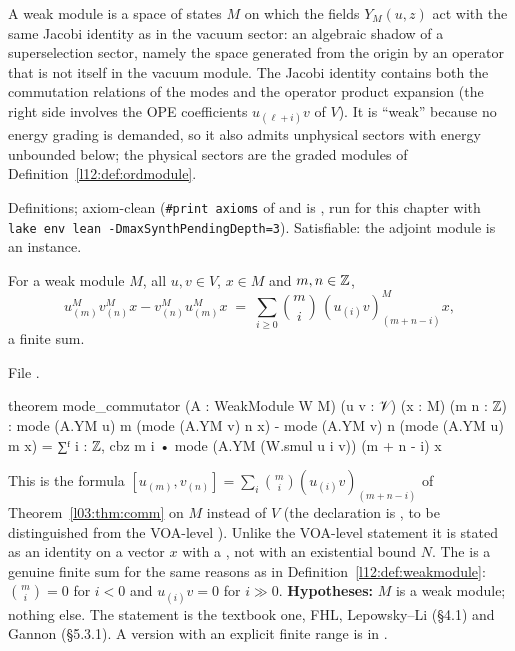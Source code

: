 \begin{physics}
A weak module is a space of states $M$ on which the fields $Y_M(u,z)$ act with the same Jacobi identity as in the
vacuum sector: an algebraic shadow of a superselection sector, namely the space generated from the origin by an
operator that is not itself in the vacuum module. The Jacobi identity contains both the commutation relations of the modes and the
operator product expansion (the right side involves the OPE coefficients $u_{(\ell+i)}v$ of $V$). It is
``weak'' because no energy grading is demanded, so it also admits unphysical sectors with energy unbounded below;
the physical sectors are the graded modules of Definition~\ref{l12:def:ordmodule}.
\end{physics}

\begin{status}
Definitions; axiom-clean (\texttt{\#print axioms} of  and  is
\lean{[propext, Classical.}\allowbreak{}\allowbreak\lean{sound]}, run for this chapter with
\texttt{lake env lean -DmaxSynthPendingDepth=3}). Satisfiable: the adjoint module is an instance.
\end{status}

\begin{theorem}\label{l12:thm:modcomm}
For a weak module $M$, all $u,v\in V$, $x\in M$ and $m,n\in{\mathbb{Z}}$,
\begin{equation*}
 u^M_{(m)}v^M_{(n)}x - v^M_{(n)}u^M_{(m)}x \;=\; \sum_{i\ge0}\binom mi\,(u_{(i)}v)^M_{(m+n-i)}x ,
\end{equation*}
a finite sum.
\end{theorem}
\noindent File .
\begin{leancode}
theorem mode_commutator (A : WeakModule W M) (u v : 𝒱) (x : M) (m n : ℤ) :
    mode (A.YM u) m (mode (A.YM v) n x) - mode (A.YM v) n (mode (A.YM u) m x)
      = ∑ᶠ i : ℤ, cbz m i • mode (A.YM (W.smul u i v)) (m + n - i) x
\end{leancode}

\begin{dictionary}
This is the formula $[u_{(m)},v_{(n)}] = \sum_i\binom mi(u_{(i)}v)_{(m+n-i)}$ of Theorem~\ref{l03:thm:comm} on $M$ instead of
$V$ (the declaration is , to be distinguished from the VOA-level
). Unlike the VOA-level statement it is stated as an identity on a vector $x$ with a
, not with an existential bound $N$. The  is a genuine finite sum for the same reasons as in
Definition~\ref{l12:def:weakmodule}: $\binom mi = 0$ for $i<0$ and $u_{(i)}v = 0$ for $i\gg0$. \textbf{Hypotheses:} $M$ is a weak
module; nothing else. The statement is the textbook one, FHL, Lepowsky--Li (\S4.1) and Gannon (\S5.3.1).
A version with an explicit finite range is  in .
\end{dictionary}

